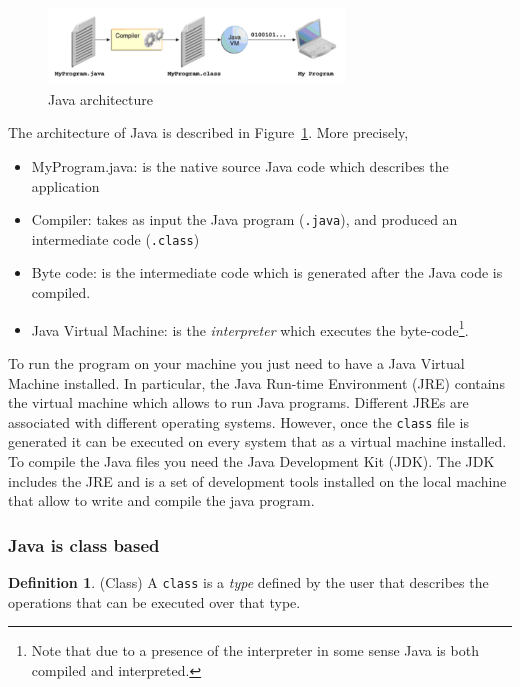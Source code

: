 \documentclass{article}
\theoremstyle{definition}
\newtheorem{mydef}{Definition}
\begin{document}
\begin{figure}[h]
\centering
    \includegraphics[width=0.7\textwidth]{Img/jvm-architecture.png}
    \caption{Java architecture}
    \label{JavaArchitecture}
\end{figure}

The architecture of Java is described in Figure~\ref{JavaArchitecture}. More precisely,

\begin{itemize}
\item MyProgram.java: is the native source Java code which describes the application 
\item Compiler: takes as input the Java program (\texttt{.java}), and produced an intermediate code (\texttt{.class})
\item Byte code: is the intermediate code which is generated after the Java code is compiled.
\item Java Virtual Machine: is the \emph{interpreter} which executes the byte-code\footnote{Note that due to a presence of the interpreter in some sense Java is both compiled and interpreted.}.
\end{itemize}

To run the program on your machine you just need to have a Java Virtual Machine installed. In particular, the Java Run-time Environment (JRE) contains the virtual machine which allows to run Java programs. Different JREs are associated with different operating systems. However, once the \texttt{class} file is generated it can be executed on every system that as a virtual machine installed. \\
To compile the Java files you need the  Java Development Kit (JDK). The JDK includes the JRE and is a set of development tools installed on the local machine that allow to write and compile the java program.




\subsubsection{Java is class based}

\begin{mydef} (Class) A \texttt{class} is a \emph{type} defined by the user that describes the operations that can be executed over that type.
\end{mydef}
\end{document}
